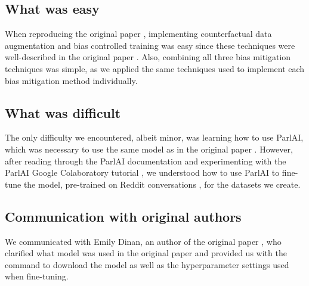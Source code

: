 \subsection*{What was easy}

When reproducing the original paper \supercite{dinan2020}, implementing counterfactual data augmentation and bias controlled training was easy since these techniques were well-described in the original paper \supercite{dinan2020}. Also, combining all three bias mitigation techniques was simple, as we applied the same techniques used to implement each bias mitigation method individually.

\subsection*{What was difficult}

The only difficulty we encountered, albeit minor, was learning how to use ParlAI, which was necessary to use the same model as in the original paper \supercite{dinan2020}. However, after reading through the ParlAI documentation and experimenting with the ParlAI Google Colaboratory tutorial \supercite{parlai-colab}, we understood how to use ParlAI to fine-tune the model, pre-trained on Reddit conversations \supercite{redditmodel}, for the datasets we create.

\subsection*{Communication with original authors}

We communicated with Emily Dinan, an author of the original paper \supercite{dinan2020}, who clarified what model was used in the original paper \supercite{dinan2020} and provided us with the command to download the model as well as the hyperparameter settings used when fine-tuning.

